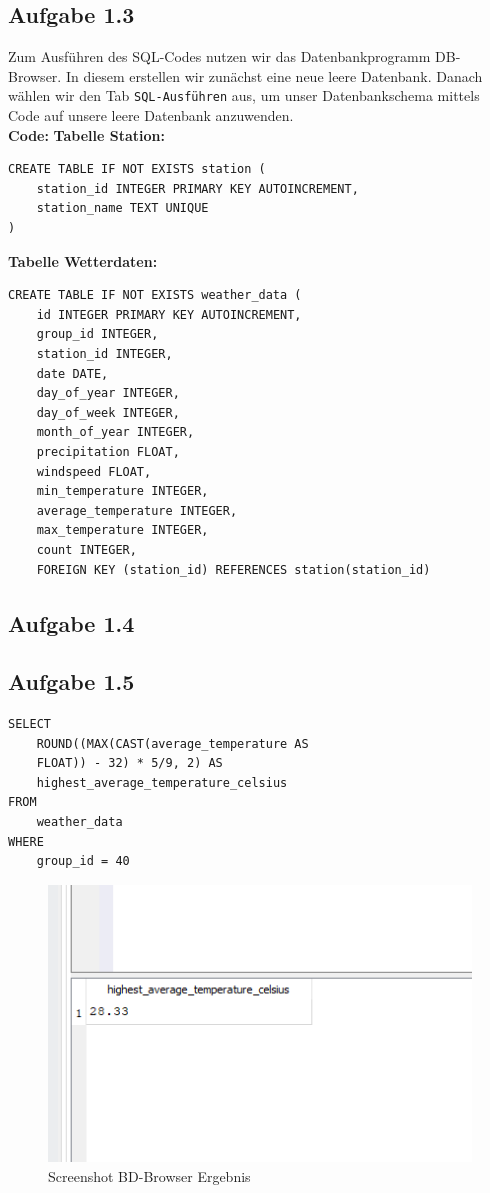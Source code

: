 \documentclass[a4paper, 12pt]{article}
\begin{document}
\subsection{Aufgabe 1.3}
Zum Ausführen des SQL-Codes nutzen wir das Datenbankprogramm DB-Browser. In diesem erstellen wir zunächst eine neue leere Datenbank. Danach wählen wir den Tab \texttt{SQL-Ausführen} aus, um unser Datenbankschema mittels Code auf unsere leere Datenbank anzuwenden.
\\

\textbf{Code:} \newline
\textbf{Tabelle Station:}
\begin{verbatim}
CREATE TABLE IF NOT EXISTS station ( 
    station_id INTEGER PRIMARY KEY AUTOINCREMENT,
    station_name TEXT UNIQUE 
)
\end{verbatim}

\textbf{Tabelle Wetterdaten:}
\begin{verbatim}
CREATE TABLE IF NOT EXISTS weather_data (
    id INTEGER PRIMARY KEY AUTOINCREMENT,
    group_id INTEGER,
    station_id INTEGER,
    date DATE,
    day_of_year INTEGER,
    day_of_week INTEGER,
    month_of_year INTEGER,
    precipitation FLOAT,
    windspeed FLOAT,
    min_temperature INTEGER,
    average_temperature INTEGER,
    max_temperature INTEGER,
    count INTEGER,
    FOREIGN KEY (station_id) REFERENCES station(station_id)
\end{verbatim}




\subsection{Aufgabe 1.4}

\newpage
\subsection{Aufgabe 1.5}
\begin{verbatim}
SELECT
    ROUND((MAX(CAST(average_temperature AS 
    FLOAT)) - 32) * 5/9, 2) AS
    highest_average_temperature_celsius 
FROM
    weather_data
WHERE
    group_id = 40
\end{verbatim}

\begin{figure}[!htb]
\centering
\includegraphics[scale=.4]{Screenshot 2024-11-26 201543}
\caption{Screenshot BD-Browser Ergebnis}
\label{fig:Screenshot BD-Browser}
\end{figure}
\end{document}
